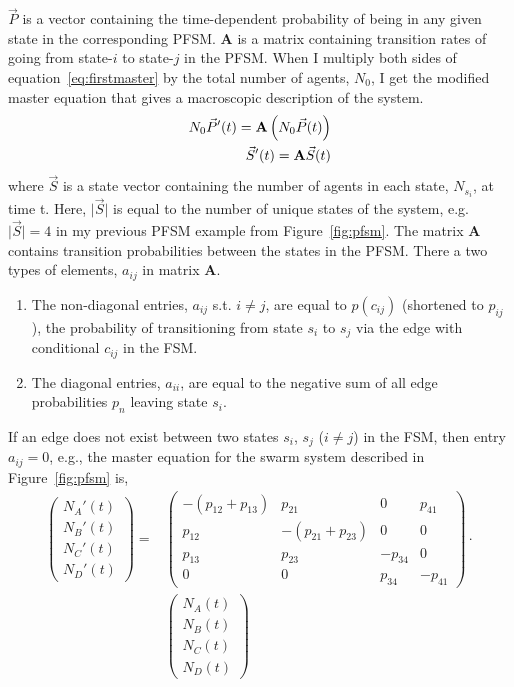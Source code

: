 \documentclass[12pt]{book}
\newcommand{\abs}[1]{\lvert#1\rvert}
\begin{document}
$\vec{P}$ is a vector containing the time-dependent probability of being in any given state in the corresponding PFSM. $\mathbf{A}$ is a matrix containing transition rates of going from state-$i$ to state-$j$ in the PFSM. When I multiply both sides of equation~\eqref{eq:firstmaster} by the total number of agents, $N_0$, I get the modified master equation that gives a macroscopic description of the system.
\begin{align}
N_0 \vec{P}'(t) = \mathbf{A}\left(N_0\vec{P}(t)\right)\notag\\
\vec{S}'(t) = \mathbf{A}\vec{S}(t)\label{eq:master}
\end{align}
where $\vec{S}$ is a state vector containing the number of agents in each state, $N_{s_i}$, at time t. Here, $\abs{\vec{S}}$ is equal to the number of unique states of the system, e.g. $\abs{\vec{S}} = 4$ in my previous PFSM example from Figure~\ref{fig:pfsm}. The matrix $\mathbf{A}$ contains transition probabilities between the states in the PFSM. There a two types of elements, $a_{ij}$ in matrix $\mathbf{A}$.
\begin{enumerate}
\item The non-diagonal entries, $a_{ij}$ s.t. $i\not=j$, are equal to $p(c_{ij})$ (shortened to $p_{ij}$), the probability of transitioning from state $s_i$ to $s_j$ via the edge with conditional $c_{ij}$ in the FSM.
\item The diagonal entries, $a_{ii}$, are equal to the negative sum of all edge probabilities $p_{n}$ leaving state $s_i$.
\end{enumerate} 
If an edge does not exist between two states $s_i$, $s_j$ ($i\not=j$) in the FSM, then entry $a_{ij} = 0$, e.g., the master equation for the swarm system described in Figure~\ref{fig:pfsm} is,
\begin{align}\label{eq:mastereqns}
\left(
	\begin{array}{c}N_A'(t) \\ N_B'(t) \\ N_C'(t) \\ N_D'(t)\end{array}
\right) = &
\left(
	\begin{array}{cccc}
	-(p_{12} + p_{13}) & p_{21} & 0 & p_{41}\\
	p_{12} & -(p_{21} + p_{23}) & 0 & 0\\
	p_{13} & p_{23} & -p_{34} & 0\\
	0 & 0 & p_{34} & -p_{41}
	\end{array}
\right)\cdot\nonumber\\
& \left(\begin{array}{c}N_A(t) \\ N_B(t) \\ N_C(t) \\ N_D(t)\end{array}\right)
\end{align}
\end{document}
